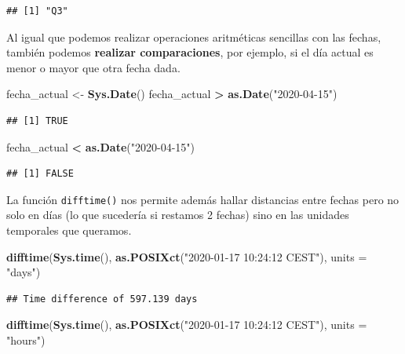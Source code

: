 \documentclass[11pt,]{book}
\newenvironment{Shaded}{\begin{snugshade}}{\end{snugshade}}
\newcommand{\DataTypeTok}[1]{\textcolor[rgb]{0.27,0.27,0.27}{#1}}
\newcommand{\KeywordTok}[1]{\textcolor[rgb]{0.27,0.27,0.27}{\textbf{#1}}}
\newcommand{\NormalTok}[1]{#1}
\newcommand{\OperatorTok}[1]{\textcolor[rgb]{0.43,0.43,0.43}{\textbf{#1}}}
\newcommand{\StringTok}[1]{\textcolor[rgb]{0.5,0.5,0.5}{#1}}
\begin{document}
\begin{verbatim}
## [1] "Q3"
\end{verbatim}

Al igual que podemos realizar operaciones aritméticas sencillas con las fechas, también podemos \textbf{realizar comparaciones}, por ejemplo, si el día actual es menor o mayor que otra fecha dada.

\begin{Shaded}
\begin{Highlighting}[]
\NormalTok{fecha_actual <-}\StringTok{ }\KeywordTok{Sys.Date}\NormalTok{()}
\NormalTok{fecha_actual }\OperatorTok{>}\StringTok{ }\KeywordTok{as.Date}\NormalTok{(}\StringTok{"2020-04-15"}\NormalTok{)}
\end{Highlighting}
\end{Shaded}

\begin{verbatim}
## [1] TRUE
\end{verbatim}

\begin{Shaded}
\begin{Highlighting}[]
\NormalTok{fecha_actual }\OperatorTok{<}\StringTok{ }\KeywordTok{as.Date}\NormalTok{(}\StringTok{"2020-04-15"}\NormalTok{)}
\end{Highlighting}
\end{Shaded}

\begin{verbatim}
## [1] FALSE
\end{verbatim}

La función \texttt{difftime()} nos permite además hallar distancias entre fechas pero no solo en días (lo que sucedería si restamos 2 fechas) sino en las unidades temporales que queramos.

\begin{Shaded}
\begin{Highlighting}[]
\KeywordTok{difftime}\NormalTok{(}\KeywordTok{Sys.time}\NormalTok{(), }\KeywordTok{as.POSIXct}\NormalTok{(}\StringTok{"2020-01-17 10:24:12 CEST"}\NormalTok{), }\DataTypeTok{units =} \StringTok{"days"}\NormalTok{)}
\end{Highlighting}
\end{Shaded}

\begin{verbatim}
## Time difference of 597.139 days
\end{verbatim}

\begin{Shaded}
\begin{Highlighting}[]
\KeywordTok{difftime}\NormalTok{(}\KeywordTok{Sys.time}\NormalTok{(), }\KeywordTok{as.POSIXct}\NormalTok{(}\StringTok{"2020-01-17 10:24:12 CEST"}\NormalTok{), }\DataTypeTok{units =} \StringTok{"hours"}\NormalTok{)}
\end{Highlighting}
\end{Shaded}
\end{document}
